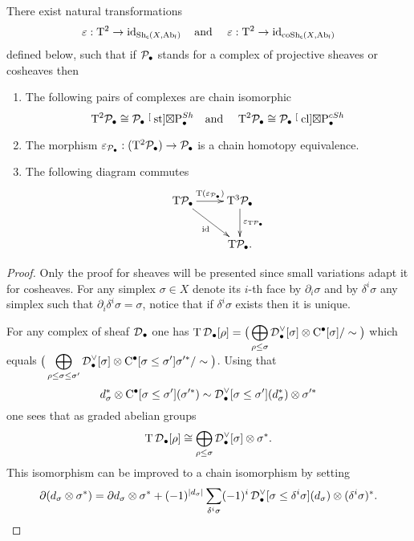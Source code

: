 \documentclass[main.tex]{subfiles}
\begin{document}
\begin{lemma}\label{T^2 = id}
There exist natural transformations
$$\varepsilon:\T^2\to\id_{\Sh_{\c}(X,\Ab_{\f})}\text{\ \ \  and \ \ \ }\varepsilon:\T^2\to\id_{\coSh_{\c}(X,\Ab_{\f})}$$
defined below, such that if $\P_\bullet$ stands for a complex of projective sheaves or cosheaves then
\begin{enumerate}
\item The following pairs of complexes are chain isomorphic
$$\T^2\P_\bullet\cong \P_\bullet\stackrel[\,\st]{}{\stensor}\Ps \text{\ \ \  and \ \ \ } \T^2\P_\bullet\cong\P_\bullet\stackrel[\,\cl]{}{\stensor}\Pcs$$
\item The morphism $\varepsilon_{\P_\bullet}:(\T^2\P_\bullet)\to\P_\bullet$ is a chain homotopy equivalence.
\item The following diagram commutes
$$\xymatrix{\T\P_\bullet \ar[r]^-{\T(\varepsilon_{\P_\bullet})} \ar[rd]_-{\id} & \T^3\P_\bullet \ar[d]^-{\varepsilon_{\T\P_\bullet}} \\ &\T\P_\bullet.}$$
\end{enumerate}
\begin{proof}
Only the proof for sheaves will be presented since small variations adapt it for cosheaves. For any simplex $\sigma\in X$ denote its $i$-th face by $\partial_i\sigma$ and by $\delta^i\sigma$ any simplex such that $\partial_i\delta^i\sigma=\sigma$, notice that if $\delta^i\sigma$ exists then it is unique.

For any complex of sheaf $\D_\bullet$ one has  $\displaystyle{\T\D_\bullet[\rho]=\big(\bigoplus_{\rho\leq\sigma}\D_\bullet^\vee[\sigma]\tensor\cochains[\sigma]/\sim\big)}$ which equals $\displaystyle{\big(\bigoplus_{\rho\leq\sigma\leq\sigma'}\D_\bullet^\vee[\sigma]\tensor\cochains[\sigma\leq\sigma']\sigma'^*/\sim\big)}$. Using that $$d_\sigma^*\tensor\cochains[\sigma\leq\sigma'](\sigma'^\ast)\sim\D_\bullet^\vee[\sigma\leq\sigma'](d_\sigma^*)\tensor \sigma'^\ast$$ one sees that as graded abelian groups $$\T\D_\bullet[\rho]\cong\bigoplus_{\rho\leq\sigma}\D_\bullet^\vee[\sigma]\tensor\sigma^*.$$ This isomorphism can be improved to a chain isomorphism by setting
$$\partial(d_\sigma\tensor\sigma^*)=\partial d_\sigma\tensor\sigma^*+(-1)^{|d_\sigma|}\sum_{\delta^i\sigma}(-1)^i\D_\bullet^\vee[\sigma\leq\delta^i\sigma](d_\sigma)\tensor(\delta^i\sigma)^*.$$


\end{proof}
\end{lemma}
\end{document}
